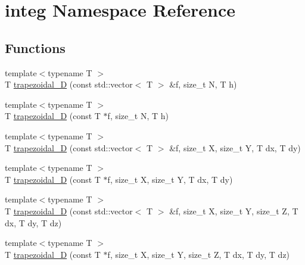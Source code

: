 \hypertarget{namespaceinteg}{}\section{integ Namespace Reference}
\label{namespaceinteg}
\subsection*{Functions}
\begin{DoxyCompactItemize}
\item 
{\footnotesize template$<$typename T $>$ }\\T \hyperlink{namespaceinteg_a7bcd1288ac97babaa60491414c5d2aa1}{trapezoidal\+\_\+D} (const std\+::vector$<$ T $>$ \&f, size\+\_\+t N, T h)
\begin{DoxyCompactList}\small\item\em 

 \end{DoxyCompactList}\item 
{\footnotesize template$<$typename T $>$ }\\T \hyperlink{namespaceinteg_ac00b1e6f9f566322518105a3710d5df7}{trapezoidal\+\_\+D} (const T $\ast$f, size\+\_\+t N, T h)
\item 
{\footnotesize template$<$typename T $>$ }\\T \hyperlink{namespaceinteg_aff6324bc1d562610bb2086538b65657c}{trapezoidal\+\_\+D} (const std\+::vector$<$ T $>$ \&f, size\+\_\+t X, size\+\_\+t Y, T dx, T dy)
\begin{DoxyCompactList}\small\item\em 

 \end{DoxyCompactList}\item 
{\footnotesize template$<$typename T $>$ }\\T \hyperlink{namespaceinteg_ae022b7e8292beec746f1b72e0a09484d}{trapezoidal\+\_\+D} (const T $\ast$f, size\+\_\+t X, size\+\_\+t Y, T dx, T dy)
\item 
{\footnotesize template$<$typename T $>$ }\\T \hyperlink{namespaceinteg_a71b791c6163be10049667e5ba5ba7617}{trapezoidal\+\_\+D} (const std\+::vector$<$ T $>$ \&f, size\+\_\+t X, size\+\_\+t Y, size\+\_\+t Z, T dx, T dy, T dz)
\begin{DoxyCompactList}\small\item\em 

 \end{DoxyCompactList}\item 
{\footnotesize template$<$typename T $>$ }\\T \hyperlink{namespaceinteg_adbdbd0ba01246eeb2b0b8659107d58ff}{trapezoidal\+\_\+D} (const T $\ast$f, size\+\_\+t X, size\+\_\+t Y, size\+\_\+t Z, T dx, T dy, T dz)
\end{DoxyCompactItemize}


